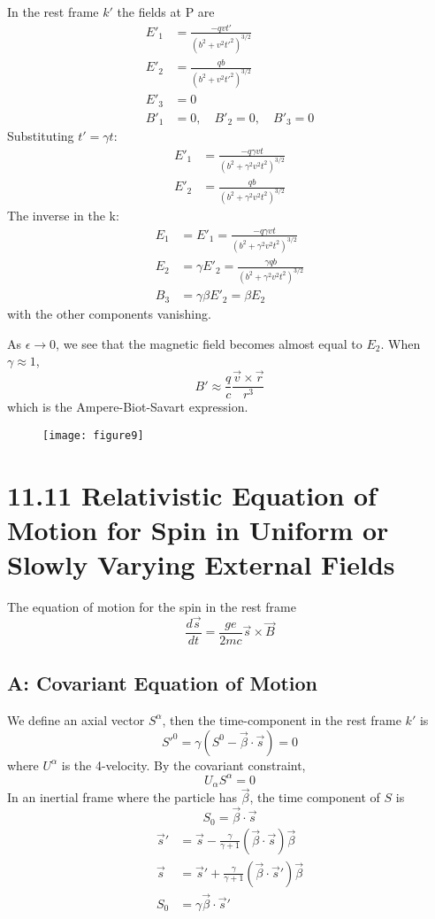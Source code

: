 \documentclass{article}
\begin{document}
	In the rest frame $k'$ the fields at P are
	\begin{align*}
		E'_1 &= \frac{-qvt'}{(b^2 + v^2 t'^2)^{3/2}} \\
		E'_2 &= \frac{qb}{(b^2 + v^2 t'^2)^{3/2}} \\
		E'_3 &= 0 \\
		B'_1 &= 0, \quad B'_2 = 0, \quad B'_3 = 0
	\end{align*}
	Substituting $t' = \gamma t$:
	\begin{align*}
		E'_1 &= \frac{-q\gamma vt}{(b^2 + \gamma^2 v^2 t^2)^{3/2}} \\
		E'_2 &= \frac{qb}{(b^2 + \gamma^2 v^2 t^2)^{3/2}}
	\end{align*}
	The inverse in the k:
	\begin{align*}
		E_1 &= E'_1 = \frac{-q\gamma vt}{(b^2 + \gamma^2 v^2 t^2)^{3/2}} \\
		E_2 &= \gamma E'_2 = \frac{\gamma q b}{(b^2 + \gamma^2 v^2 t^2)^{3/2}} \\
		B_3 &= \gamma \beta E'_2 = \beta E_2
	\end{align*}
	with the other components vanishing.
	
	As $\epsilon \to 0$, we see that the magnetic field becomes almost equal to $E_2$. When $\gamma \approx 1$,
	\[ B' \approx \frac{q}{c} \frac{\vec{v} \times \vec{r}}{r^3} \]
	which is the Ampere-Biot-Savart expression.
	
	\begin{figure}[h]
		\centering
		\texttt{[image: figure9]}
		\caption{}
		\label{fig:figure9}
	\end{figure}
	
	\section*{11.11 Relativistic Equation of Motion for Spin in Uniform or Slowly Varying External Fields}
	The equation of motion for the spin in the rest frame
	\[ \frac{d\vec{s}}{dt} = \frac{ge}{2mc} \vec{s} \times \vec{B} \]
	
	\subsection*{A: Covariant Equation of Motion}
	We define an axial vector $S^\alpha$, then the time-component in the rest frame $k'$ is
	\[ S'^0 = \gamma(S^0 - \vec{\beta} \cdot \vec{s}) = 0 \]
	where $U^\alpha$ is the 4-velocity.
	By the covariant constraint,
	\[ U_\alpha S^\alpha = 0 \]
	In an inertial frame where the particle has $\vec{\beta}$, the time component of $S$ is
	\[ S_0 = \vec{\beta} \cdot \vec{s} \]
	\begin{align*}
		\vec{s}' &= \vec{s} - \frac{\gamma}{\gamma+1}(\vec{\beta} \cdot \vec{s})\vec{\beta} \\
		\vec{s} &= \vec{s}' + \frac{\gamma}{\gamma+1}(\vec{\beta} \cdot \vec{s}')\vec{\beta} \\
		S_0 &= \gamma \vec{\beta} \cdot \vec{s}'
	\end{align*}
\end{document}
